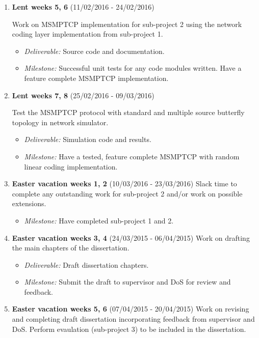 \documentclass[12pt,a4paper,twoside]{article}
\begin{document}
\begin{enumerate}
\item {\bf Lent weeks 5, 6} (11/02/2016 - 24/02/2016)

Work on MSMPTCP implementation for sub-project 2 using the network coding layer implementation from sub-project 1.
\begin{itemize}
  \item {\em Deliverable:} Source code and documentation.
  \item {\em Milestone:} Successful unit tests for any code modules written. Have a feature complete MSMPTCP implementation.
\end{itemize}

\item {\bf Lent weeks 7, 8} (25/02/2016 - 09/03/2016)

Test the MSMPTCP protocol with standard and multiple source butterfly topology in network simulator.
\begin{itemize}
  \item {\em Deliverable:} Simulation code and results.
  \item {\em Milestone:} Have a tested, feature complete MSMPTCP with random linear coding implementation.
\end{itemize}

\item {\bf Easter vacation weeks 1, 2} (10/03/2016 - 23/03/2016)
Slack time to complete any outstanding work for sub-project 2 and/or work on possible extensions.

\begin{itemize}
  \item {\em Milestone:} Have completed sub-project 1 and 2.
\end{itemize}

\item {\bf Easter vacation weeks 3, 4} (24/03/2015 - 06/04/2015)
Work on drafting the main chapters of the dissertation.

\begin{itemize}
  \item {\em Deliverable:} Draft dissertation chapters.
  \item {\em Milestone:} Submit the draft to supervisor and DoS for review and feedback.
\end{itemize}

\item {\bf Easter vacation weeks 5, 6} (07/04/2015 - 20/04/2015)
Work on revising and completing draft dissertation incorporating feedback from supervisor and DoS. Perform evaulation (sub-project 3) to be included in the dissertation.


\end{enumerate}
\end{document}
